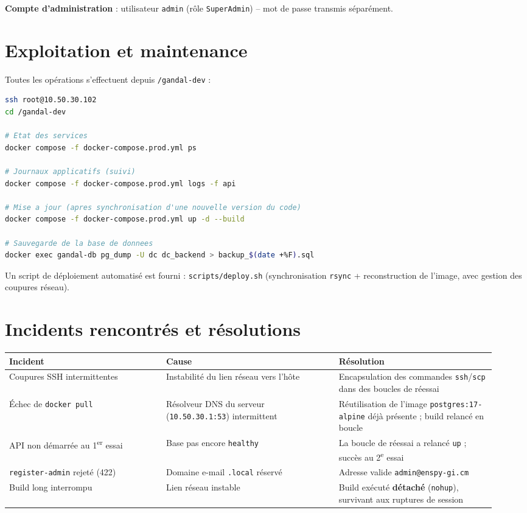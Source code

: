 \documentclass[11pt,a4paper]{article}
\newcommand{\code}[1]{\texttt{\small #1}}
\begin{document}
\medskip
\noindent\textbf{Compte d'administration} : utilisateur \code{admin} (rôle
\code{SuperAdmin}) -- mot de passe transmis séparément.

\section{Exploitation et maintenance}

Toutes les opérations s'effectuent depuis \code{/gandal-dev} :

\begin{lstlisting}[language=bash]
ssh root@10.50.30.102
cd /gandal-dev

# Etat des services
docker compose -f docker-compose.prod.yml ps

# Journaux applicatifs (suivi)
docker compose -f docker-compose.prod.yml logs -f api

# Mise a jour (apres synchronisation d'une nouvelle version du code)
docker compose -f docker-compose.prod.yml up -d --build

# Sauvegarde de la base de donnees
docker exec gandal-db pg_dump -U dc dc_backend > backup_$(date +%F).sql
\end{lstlisting}

\noindent Un script de déploiement automatisé est fourni : \code{scripts/deploy.sh}
(synchronisation \code{rsync} + reconstruction de l'image, avec gestion des coupures
réseau).

\section{Incidents rencontrés et résolutions}

\begin{longtable}{@{}p{0.30\linewidth} p{0.33\linewidth} p{0.30\linewidth}@{}}
\toprule
\textbf{Incident} & \textbf{Cause} & \textbf{Résolution} \\
\midrule
\endhead
Coupures SSH intermittentes & Instabilité du lien réseau vers l'hôte & Encapsulation des
commandes \code{ssh}/\code{scp} dans des boucles de réessai \\
Échec de \code{docker pull} & Résolveur DNS du serveur (\code{10.50.30.1:53})
intermittent & Réutilisation de l'image \code{postgres:17-alpine} déjà présente ; build
relancé en boucle \\
API non démarrée au 1\textsuperscript{er} essai & Base pas encore \code{healthy} & La
boucle de réessai a relancé \code{up} ; succès au 2\textsuperscript{e} essai \\
\code{register-admin} rejeté (422) & Domaine e-mail \code{.local} réservé & Adresse valide
\code{admin@enspy-gi.cm} \\
Build long interrompu & Lien réseau instable & Build exécuté \textbf{détaché}
(\code{nohup}), survivant aux ruptures de session \\
\bottomrule
\end{longtable}
\end{document}
